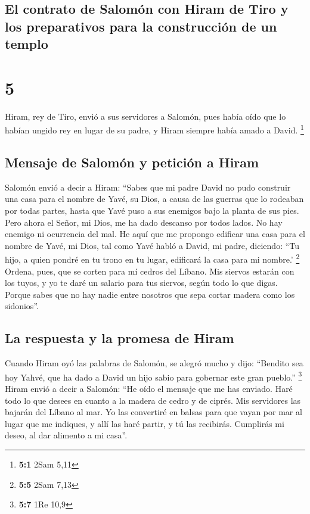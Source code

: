 \begin{paracol}{2}
{\subsection{El contrato de Salomón con Hiram de Tiro y los preparativos
para la construcción de un
templo}\label{el-contrato-de-salomuxf3n-con-hiram-de-tiro-y-los-preparativos-para-la-construcciuxf3n-de-un-templo}}

\hypertarget{section-8}{%
\section{5}\label{section-8}}

 Hiram, rey de Tiro, envió a sus servidores a Salomón,
pues había oído que lo habían ungido rey en lugar de su padre, y Hiram
siempre había amado a David. \footnote{\textbf{5:1} 2Sam 5,11}

\hypertarget{mensaje-de-salomuxf3n-y-peticiuxf3n-a-hiram}{%
\subsection{Mensaje de Salomón y petición a
Hiram}\label{mensaje-de-salomuxf3n-y-peticiuxf3n-a-hiram}}

 Salomón envió a decir a Hiram:  ``Sabes que
mi padre David no pudo construir una casa para el nombre de Yavé, su
Dios, a causa de las guerras que lo rodeaban por todas partes, hasta que
Yavé puso a sus enemigos bajo la planta de sus pies.  Pero
ahora el Señor, mi Dios, me ha dado descanso por todos lados. No hay
enemigo ni ocurrencia del mal.  He aquí que me propongo
edificar una casa para el nombre de Yavé, mi Dios, tal como Yavé habló a
David, mi padre, diciendo: ``Tu hijo, a quien pondré en tu trono en tu
lugar, edificará la casa para mi nombre.' \footnote{\textbf{5:5} 2Sam
  7,13}  Ordena, pues, que se corten para mí cedros del
Líbano. Mis siervos estarán con los tuyos, y yo te daré un salario para
tus siervos, según todo lo que digas. Porque sabes que no hay nadie
entre nosotros que sepa cortar madera como los sidonios''.

\hypertarget{la-respuesta-y-la-promesa-de-hiram}{%
\subsection{La respuesta y la promesa de
Hiram}\label{la-respuesta-y-la-promesa-de-hiram}}

 Cuando Hiram oyó las palabras de Salomón, se alegró mucho
y dijo: ``Bendito sea hoy Yahvé, que ha dado a David un hijo sabio para
gobernar este gran pueblo.'' \footnote{\textbf{5:7} 1Re 10,9}
 Hiram envió a decir a Salomón: ``He oído el mensaje que
me has enviado. Haré todo lo que desees en cuanto a la madera de cedro y
de ciprés.  Mis servidores las bajarán del Líbano al mar.
Yo las convertiré en balsas para que vayan por mar al lugar que me
indiques, y allí las haré partir, y tú las recibirás. Cumplirás mi
deseo, al dar alimento a mi casa''.


\end{paracol}
